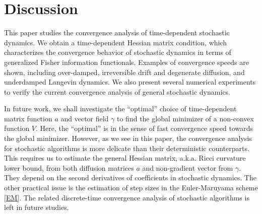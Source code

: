 \documentclass[11pt,reqno]{amsart}
\begin{document}
\section{Discussion}
This paper studies the convergence analysis of time-dependent stochastic dynamics. We obtain a time-dependent Hessian matrix condition, which characterizes the convergence behavior of stochastic dynamics in terms of generalized Fisher information functionals.
Examples of convergence speeds are shown, including over-damped, irreversible drift and degenerate diffusion, and underdamped Langevin dynamics. We also present several numerical experiments to verify the current convergence analysis of general stochastic dynamics. 

In future work, we shall investigate the ``optimal'' choice of time-dependent matrix function $a$ and vector field $\gamma$ to find the global minimizer of a non-convex function $V$. Here, the ``optimal'' is in the sense of fast convergence speed towards the global minimizer. 
However, as we see in this paper, the convergence analysis for stochastic algorithms is more delicate than their deterministic counterparts. This requires us to estimate the general Hessian matrix, a.k.a. Ricci curvature lower bound, from both diffusion matrices $a$ and non-gradient vector from $\gamma$. They depend on the second derivatives of coefficients in stochastic dynamics. The other practical issue is the estimation of step sizes in the Euler-Maruyama scheme \eqref{EM}. The related discrete-time convergence analysis of stochastic algorithms is left in future studies. 
\end{document}
